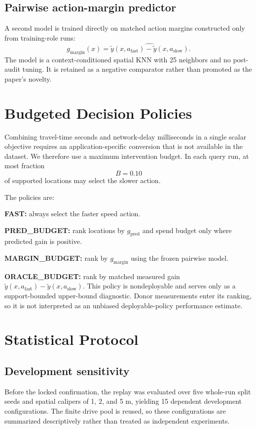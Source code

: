 \documentclass[journal]{IEEEtran}
\begin{document}
\subsection{Pairwise action-margin predictor}
A second model is trained directly on matched action margins constructed only from training-role runs:
\begin{equation}
g_{\mathrm{margin}}(x)
=
\widehat{\tilde y(x,a_{\mathrm{fast}})
-\tilde y(x,a_{\mathrm{slow}})}.
\end{equation}
The model is a context-conditioned spatial KNN with 25 neighbors and no post-audit tuning. It is retained as a negative comparator rather than promoted as the paper's novelty.

\section{Budgeted Decision Policies}
Combining travel-time seconds and network-delay milliseconds in a single scalar objective requires an application-specific conversion that is not available in the dataset. We therefore use a maximum intervention budget. In each query run, at most fraction
\begin{equation}
B=0.10
\end{equation}
of supported locations may select the slower action.

The policies are:

\noindent\textbf{FAST:} always select the faster speed action.

\noindent\textbf{PRED\_BUDGET:} rank locations by $g_{\mathrm{pred}}$ and spend budget only where predicted gain is positive.

\noindent\textbf{MARGIN\_BUDGET:} rank by $g_{\mathrm{margin}}$ using the frozen pairwise model.

\noindent\textbf{ORACLE\_BUDGET:} rank by matched measured gain $\tilde y(x,a_{\mathrm{fast}})-\tilde y(x,a_{\mathrm{slow}})$. This policy is nondeployable and serves only as a support-bounded upper-bound diagnostic. Donor measurements enter its ranking, so it is not interpreted as an unbiased deployable-policy performance estimate.

\section{Statistical Protocol}
\subsection{Development sensitivity}
Before the locked confirmation, the replay was evaluated over five whole-run split seeds and spatial calipers of 1, 2, and 5 m, yielding 15 dependent development configurations. The finite drive pool is reused, so these configurations are summarized descriptively rather than treated as independent experiments.
\end{document}
